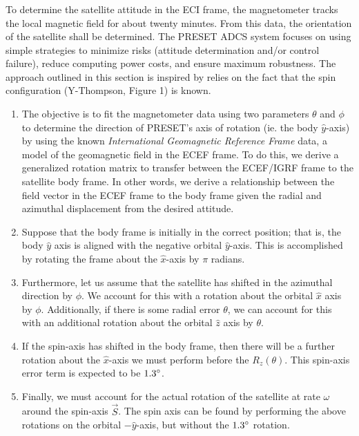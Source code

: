 \documentclass{article}
\begin{document}
\subsubsection{\color{black}{Attitude Determination Technique}}

To determine the satellite attitude in the ECI frame, the magnetometer tracks the local magnetic field for about twenty minutes. From this data, the orientation of the satellite shall be determined. The PRESET ADCS system focuses on using simple strategies to minimize risks (attitude determination and/or control failure), reduce computing power costs, and ensure maximum robustness. The approach outlined in this section is inspired by \cite{tsai} relies on the fact that the spin configuration (Y-Thompson, Figure 1) is known. 

\begin{enumerate}
	\item The objective is to fit the magnetometer data using two parameters $\theta$ and $\phi$ to determine the direction of PRESET's axis of rotation (ie. the body $\hat{y}$-axis) by using the known \textit{International Geomagnetic Reference Frame} data, a model of the geomagnetic field in the ECEF frame. To do this, we derive a generalized rotation matrix to transfer between the ECEF/IGRF frame to the satellite body frame. In other words, we derive a relationship between the field vector in the ECEF frame to the body frame given the radial and azimuthal displacement from the desired attitude.
	\item Suppose that the body frame is initially in the correct position; that is, the body $\hat{y}$ axis is aligned with the negative orbital $\hat{y}$-axis. This is accomplished by rotating the frame about the $\hat{x}$-axis by $\pi$ radians. 
	\item Furthermore, let us assume that the satellite has shifted in the azimuthal direction by $\phi$. We account for this with a rotation about the orbital $\hat{x}$ axis by $\phi$. Additionally, if there is some radial error $\theta$, we can account for this with an additional rotation about the orbital $\hat{z}$ axis by $\theta$.  
	\item If the spin-axis has shifted in the body frame, then there will be a further rotation about the $\hat{x}$-axis we must perform before the $R_{z}(\theta)$. This spin-axis error term is expected to be $1.3 \degree$. 
	\item Finally, we must account for the actual rotation of the satellite at rate $\omega$ around the spin-axis $\vec{S}$. The spin axis can be found by performing the above rotations on the orbital $-\hat{y}$-axis, but without the $1.3 \degree$ rotation.
\end{enumerate}
\end{document}
